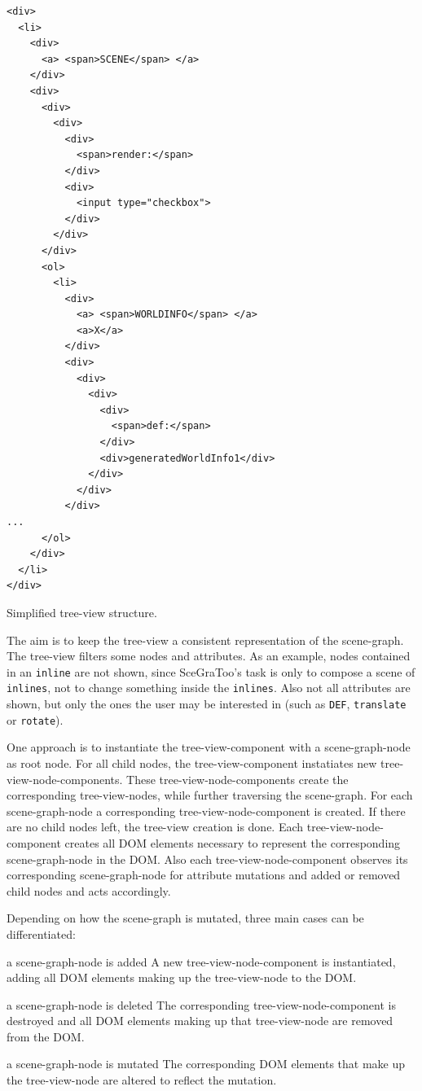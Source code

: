 \begin{listing}
  \begin{verbatim}
<div>
  <li>
    <div>
      <a> <span>SCENE</span> </a>
    </div>
    <div>
      <div>
        <div>
          <div>
            <span>render:</span>
          </div>
          <div>
            <input type="checkbox">
          </div>
        </div>
      </div>
      <ol>
        <li>
          <div>
            <a> <span>WORLDINFO</span> </a>
            <a>X</a>
          </div>
          <div>
            <div>
              <div>
                <div>
                  <span>def:</span>
                </div>
                <div>generatedWorldInfo1</div>
              </div>
            </div>
          </div>
...
      </ol>
    </div>
  </li>
</div>
  \end{verbatim}
  \caption{Simplified tree-view structure.}
  \label{list:tree-view}
\end{listing}

The aim is to keep the tree-view a consistent representation of the scene-graph.
The tree-view filters some nodes and attributes. As an example, nodes contained
in an \texttt{inline} are not shown, since  SceGraToo's task is only to compose
a scene of \texttt{inlines}, not to change something inside the \texttt{inlines}.
Also not all attributes are shown, but only the ones the user may be interested
in (such as \texttt{DEF}, \texttt{translate} or \texttt{rotate}).

One approach is to instantiate the tree-view-component with a
scene-graph-node as root node. For all child nodes, the tree-view-component
instatiates new tree-view-node-components. These tree-view-node-components
create the corresponding tree-view-nodes, while further traversing the
scene-graph. For each scene-graph-node a corresponding tree-view-node-component
is created. If there are no child nodes left, the tree-view creation is done.
Each tree-view-node-component creates all \gls{DOM} elements necessary to represent
the corresponding scene-graph-node in the \gls{DOM}. Also each
tree-view-node-component observes its corresponding scene-graph-node for
attribute mutations and added or removed child nodes and acts accordingly.

Depending on how the scene-graph is mutated, three main cases can be differentiated:

\begin{description*}
  \item[a scene-graph-node is added]
    A new tree-view-node-component is instantiated, adding all \gls{DOM} elements making up the tree-view-node to the \gls{DOM}.
  \item[a scene-graph-node is deleted]
    The corresponding tree-view-node-compo\-nent is destroyed and all \gls{DOM} elements making up that tree-view-node are removed from the \gls{DOM}.
  \item[a scene-graph-node is mutated]
    The corresponding \gls{DOM} elements that make up the  tree-view-node are altered to reflect the mutation.
\end{description*}

